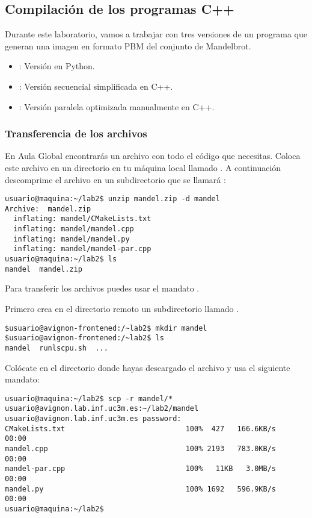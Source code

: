 \subsection{Compilación de los programas C++}

Durante este laboratorio, vamos a trabajar con tres versiones de un programa
que generan una imagen en formato PBM del conjunto de Mandelbrot.

\begin{itemize}
  \item {}: Versión en Python.
  \item {}: Versión secuencial simplificada en C++.
  \item {}: Versión paralela optimizada manualmente en C++.
\end{itemize}

\subsubsection{Transferencia de los archivos}

En Aula Global encontrarás un archivo  con todo el código que
necesitas. Coloca este archivo en un directorio en tu máquina local llamado
. A continuación descomprime el archivo en un subdirectorio que
se llamará :

\begin{lstlisting}[style=terminal]
usuario@maquina:~/lab2$ unzip mandel.zip -d mandel
Archive:  mandel.zip
  inflating: mandel/CMakeLists.txt   
  inflating: mandel/mandel.cpp       
  inflating: mandel/mandel.py        
  inflating: mandel/mandel-par.cpp   
usuario@maquina:~/lab2$ ls
mandel  mandel.zip
\end{lstlisting}

Para transferir los archivos puedes usar el mandato .

Primero crea en el directorio remoto un subdirectorio llamado .

\begin{lstlisting}[style=terminal]
$usuario@avignon-frontened:/~lab2$ mkdir mandel
$usuario@avignon-frontened:/~lab2$ ls
mandel  runlscpu.sh  ...
\end{lstlisting}

Colócate en el directorio donde hayas descargado el archivo 
y usa el siguiente mandato:

\begin{lstlisting}[style=terminal,basicstyle=\tiny\ttfamily,columns=fixed]
usuario@maquina:~/lab2$ scp -r mandel/* usuario@avignon.lab.inf.uc3m.es:~/lab2/mandel
usuario@avignon.lab.inf.uc3m.es password: 
CMakeLists.txt                            100%  427   166.6KB/s   00:00    
mandel.cpp                                100% 2193   783.0KB/s   00:00    
mandel-par.cpp                            100%   11KB   3.0MB/s   00:00    
mandel.py                                 100% 1692   596.9KB/s   00:00    
usuario@maquina:~/lab2$ 
\end{lstlisting}

